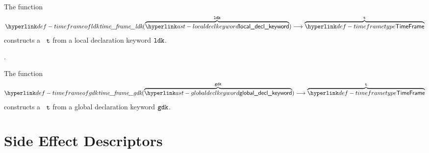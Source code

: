 \hypertarget{def-timeframeofldk}{}
The function
\[
    \timeframeofldk(\overname{\localdeclkeyword}{\ldk}) \aslto \overname{\TTimeFrame}{\vt}
\]
constructs a \timeframeterm\ $\vt$ from a local declaration keyword $\ldk$.

\ProseParagraph
{}.

\FormallyParagraph
\begin{mathpar}
\end{mathpar}

\hypertarget{def-timeframeofgdk}{}
The function
\[
    \timeframeofgdk(\overname{\globaldeclkeyword}{\gdk}) \aslto \overname{\TTimeFrame}{\vt}
\]
constructs a \timeframeterm\ $\vt$ from a global declaration keyword $\gdk$.

\ProseParagraph
{}

\FormallyParagraph
\begin{mathpar}
\end{mathpar}

\section{Side Effect Descriptors\label{sec:SideEffectDescriptors}}

